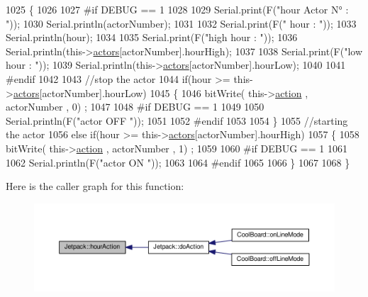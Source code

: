 \begin{DoxyCode}
1025 \{
1026 
1027 \textcolor{preprocessor}{#if DEBUG == 1}
1028     
1029     Serial.print(F(\textcolor{stringliteral}{"hour Actor N° : "}));
1030     Serial.println(actorNumber);
1031 
1032     Serial.print(F(\textcolor{stringliteral}{" hour : "}));
1033     Serial.println(hour);
1034 
1035     Serial.print(F(\textcolor{stringliteral}{"high hour : "}));
1036     Serial.println(this->\hyperlink{class_jetpack_a7e16d2f97837f9712a2e6de1c50d99db}{actors}[actorNumber].hourHigh);
1037 
1038     Serial.print(F(\textcolor{stringliteral}{"low hour : "}));
1039     Serial.println(this->\hyperlink{class_jetpack_a7e16d2f97837f9712a2e6de1c50d99db}{actors}[actorNumber].hourLow);
1040 
1041 \textcolor{preprocessor}{#endif}
1042 
1043     \textcolor{comment}{//stop the actor    }
1044     \textcolor{keywordflow}{if}(hour >= this->\hyperlink{class_jetpack_a7e16d2f97837f9712a2e6de1c50d99db}{actors}[actorNumber].hourLow)
1045     \{
1046         bitWrite( this->\hyperlink{class_jetpack_aca3142925a7b0834b34ae91d26af7765}{action} , actorNumber , 0) ;
1047 
1048 \textcolor{preprocessor}{    #if DEBUG == 1 }
1049 
1050         Serial.println(F(\textcolor{stringliteral}{"actor OFF "}));
1051 
1052 \textcolor{preprocessor}{    #endif  }
1053 
1054     \}
1055     \textcolor{comment}{//starting the actor}
1056     \textcolor{keywordflow}{else} \textcolor{keywordflow}{if}(hour >= this->\hyperlink{class_jetpack_a7e16d2f97837f9712a2e6de1c50d99db}{actors}[actorNumber].hourHigh)
1057     \{
1058         bitWrite( this->\hyperlink{class_jetpack_aca3142925a7b0834b34ae91d26af7765}{action} , actorNumber , 1) ;
1059 
1060 \textcolor{preprocessor}{    #if DEBUG == 1 }
1061 
1062         Serial.println(F(\textcolor{stringliteral}{"actor ON "}));
1063 
1064 \textcolor{preprocessor}{    #endif  }
1065     
1066     \}
1067 
1068 \}
\end{DoxyCode}
Here is the caller graph for this function\+:
\nopagebreak
\begin{figure}[H]
\begin{center}
\leavevmode
\includegraphics[width=350pt]{df/d1d/class_jetpack_acd6889af2fe5b057c6bd51b6dac827ef_icgraph}
\end{center}
\end{figure}
\mbox{\label{class_jetpack_ae01c13c785ebdf1b0bb5500234aba1bd}} 
